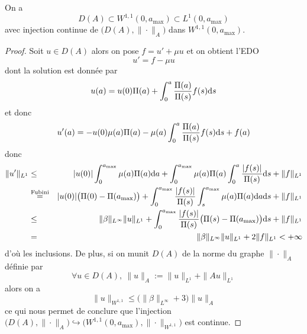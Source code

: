 \begin{proposition}\label{prop_injec_DA_W}
    On a 
    \begin{equation*}
        D(A) \subset W^{1,1}(0,a_{\max}) \subset L^1(0,a_{\max})
    \end{equation*}
    avec injection continue de $\big(D(A),\|\cdot\|_A\big)$ dans $W^{1,1}(0,a_{\max})$.
\end{proposition}

\begin{proof}
    Soit $u \in D(A)$ alors on pose $f=u'+\mu u$ et on obtient l'EDO 
    \begin{equation*}
        u' = f-\mu u 
    \end{equation*}
    dont la solution est donnée par 
    \begin{equation*}
        u(a) = u(0)\Pi(a) + \int_0^a \frac{\Pi(a)}{\Pi(s)}f(s)\mathrm{d} s
    \end{equation*}
    et donc 
    \begin{equation*}
        u'(a) = -u(0)\mu(a)\Pi(a) - \mu(a)\int_0^a \frac{\Pi(a)}{\Pi(s)}f(s) \mathrm{d} s + f(a)
    \end{equation*}
    donc 
    \begin{eqnarray*}
        \|u'\|_{L^1} &\leq& |u(0)|\int_0^{a_{\max}} \mu(a)\Pi(a)\mathrm{d} a + \int_0^{a_{\max}} \mu(a)\Pi(a)\int_0^a \frac{|f(s)|}{\Pi(s)}\mathrm{d} s + \|f\|_{L^1} \\
        &\overset{\text{Fubini}}{=}& |u(0)|\big(\Pi(0)-\Pi(a_{\max})\big) + \int_0^{a_{\max}} \frac{|f(s)|}{\Pi(s)}\int_s^{a_{\max}} \mu(a)\Pi(a)\mathrm{d} a\mathrm{d} s +\|f\|_{L^1} \\
        &\leq& \|\beta\|_{L^\infty}\|u\|_{L^1} + \int_0^{a_{\max}}\frac{|f(s)|}{\Pi(s)}\big(\Pi(s)-\Pi(a_{\max})\big)\mathrm{d} s +\|f\|_{L^1} \\
        &=& \|\beta\|_{L^\infty}\|u\|_{L^1}+2\|f\|_{L^1}<+\infty
    \end{eqnarray*}
    d'où les inclusions. De plus, si on munit $D(A)$ de la norme du graphe $\|\cdot\|_A$ définie par 
    \begin{equation*}
        \forall u \in D(A), \ \|u\|_A := \|u\|_{L^1} + \|Au\|_{L^1}
    \end{equation*}
    alors on a 
    \begin{equation}\label{norme_W_DA}
        \|u\|_{W^{1,1}} \leq \big(\|\beta\|_{L^\infty}+3\big)\|u\|_A
    \end{equation}
    ce qui nous permet de conclure que l'injection $\big(D(A),\|\cdot\|_A\big) \hookrightarrow \big(W^{1,1}(0,a_{\max}),\|\cdot\|_{W^{1,1}}\big)$ est continue.
\end{proof}

